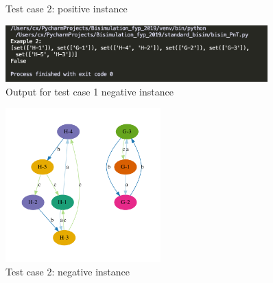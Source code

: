 \begin{figure}[H]
    \centering
    \caption{Test case 2: positive instance}
    \label{fig:output2g}
\end{figure}

\begin{figure}[H]
\centering
\includegraphics[width=0.9\textwidth]{img/output2-.png}
\caption{Output for test case 1 negative instance}
\label{fig:output2-}
\end{figure}
\begin{figure}[H]
    \centering
    \includegraphics[height=16em]{img/output2g-.pdf}
    \caption{Test case 2: negative instance}
    \label{fig:output2g-}
\end{figure}

